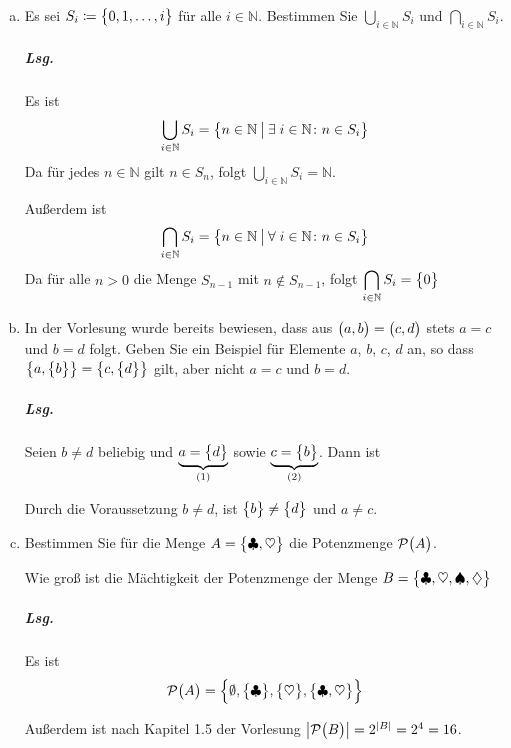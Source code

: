 \documentclass{scrreprt}
\begin{document}
\begin{enumerate}[(a)]
\newpage
\item Es sei $S_i \coloneqq \qty\big{0, 1, \ldots, i}$ für alle
  $i \in \mathbb{N}$.
  Bestimmen Sie $\displaystyle \bigcup_{i \in \mathbb{N}} S_i$ und
  $\displaystyle \bigcap_{i \in \mathbb{N}} S_i$.

  \subparagraph{Lsg.} Es ist
  \[
    \bigcup_{i \in \mathbb{N}} S_i = \qty\big{
      n \in \mathbb{N} \:{\big |}\:
      \exists\; i \in \mathbb{N} \colon n \in S_i
    }
  \]
  Da für jedes $n \in \mathbb{N}$ gilt $n \in S_n$, folgt
  $\displaystyle \bigcup_{i \in \mathbb{N}} S_i = \mathbb{N}$.

  Außerdem ist 
  \[
    \bigcap_{i \in \mathbb{N}} S_i = \qty\big{
      n \in \mathbb{N} \:{\big |}\:
      \forall\; i \in \mathbb{N} \colon n \in S_i
    }
  \]
  Da für alle $n > 0$ die Menge $S_{n - 1}$ mit $n \notin S_{n - 1}$, folgt
  $\displaystyle \bigcap_{i \in \mathbb{N}} S_i = \qty\big{0}$

\item In der Vorlesung wurde bereits bewiesen, dass aus
  $\qty\big(a, b) = \qty\big(c, d)$ stets $a = c$ und $b = d$ folgt.
  Geben Sie ein Beispiel für Elemente $a$, $b$, $c$, $d$ an, so dass
  $\qty{a, \qty\big{b}} = \qty{c, \qty\big{d}}$ gilt, aber nicht
  $a = c$ und $b = d$.

  \subparagraph{Lsg.} Seien $b \neq d$ beliebig und
  $\underset{(1)}{\underbrace{a = \qty\big{d}}}$ sowie
  $\underset{(2)}{\underbrace{c = \qty\big{b}}}$.
  Dann ist
  Durch die Voraussetzung $b \ne d$, ist $\qty\big{b} \ne \qty\big{d}$ und
  $a \ne c$.

\item Bestimmen Sie für die Menge $A = \qty\big{\clubsuit, \heartsuit}$ die
  Potenzmenge $\mathcal{P}\qty\big(A)$.

  Wie groß ist die Mächtigkeit der Potenzmenge der Menge
  $B = \qty\big{\clubsuit, \heartsuit, \spadesuit, \diamondsuit}$

  \subparagraph{Lsg.} Es ist
  \[
    \mathcal{P}\qty\big(A) = \qty\Big{
      \emptyset, \qty\big{\clubsuit}, \qty\big{\heartsuit}, \qty\big{\clubsuit, \heartsuit}
    }
  \]

  Außerdem ist nach Kapitel 1.5 der Vorlesung
  $\abs{\mathcal{P}\qty\big(B)} = 2^{\abs{B}} = 2^4 = 16$.
\end{enumerate}
\end{document}
